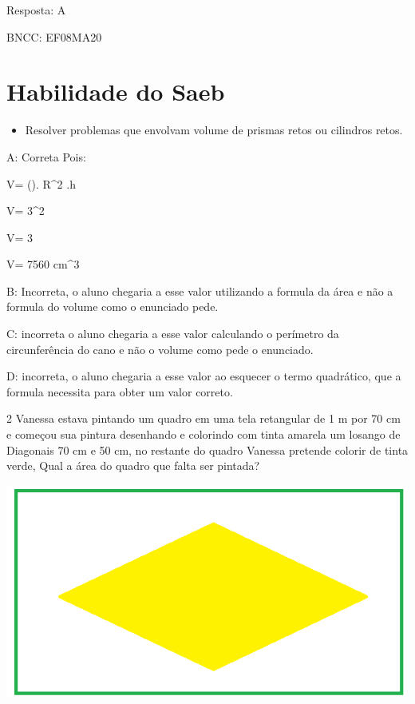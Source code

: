 Resposta: A

BNCC: EF08MA20

\section{Habilidade do Saeb}

\begin{itemize}
\tightlist

\item 
  Resolver problemas que envolvam volume de prismas retos ou cilindros
  retos.
\end{itemize}

A: Correta Pois:

V= (\Pi). R^2 .h

V= 3^2

V= 3

V= 7560 cm^3

B: Incorreta, o aluno chegaria a esse valor utilizando a formula da área
e não a formula do volume como o enunciado pede.

C: incorreta o aluno chegaria a esse valor calculando o perímetro da
circunferência do cano e não o volume como pede o enunciado.

D: incorreta, o aluno chegaria a esse valor ao esquecer o termo
quadrático, que a formula necessita para obter um valor correto.

\num{2} Vanessa estava pintando um quadro em uma tela retangular de 1 m por
70 cm e começou sua pintura desenhando e colorindo com tinta amarela um
losango de Diagonais 70 cm e 50 cm, no restante do quadro Vanessa
pretende colorir de tinta verde, Qual a área do quadro que falta ser
pintada?

\includegraphics[width=2\times 95833in,height=1\times 56526in]{./imgSAEB_8_MAT/media/image54.png}

